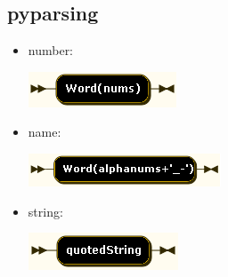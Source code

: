 \subsection{pyparsing}
\begin{itemize}
\item number:

\includegraphics[scale=0.66]{images/grammar/number.png}

\item name:

\includegraphics[scale=0.66]{images/grammar/name.png}

\item string:

\includegraphics[scale=0.66]{images/grammar/string.png}
\end{itemize}
